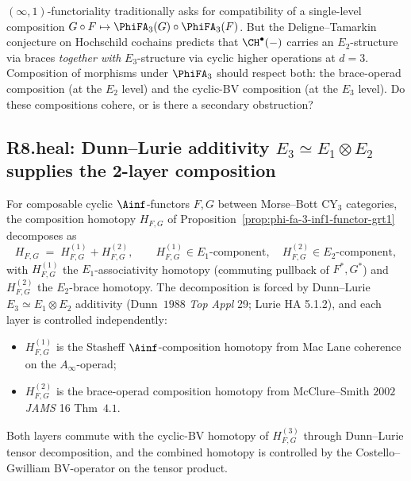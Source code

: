$(\infty,1)$-functoriality traditionally asks for compatibility of a
single-level composition $G \circ F \mapsto \PhiFA_3(G) \circ
\PhiFA_3(F)$.  But the Deligne--Tamarkin conjecture on Hochschild
cochains predicts that $\CH^\bullet(-)$ carries an $E_2$-structure via
braces \emph{together with} $E_3$-structure via cyclic higher
operations at $d = 3$.  Composition of morphisms under $\PhiFA_3$
should respect both: the brace-operad composition (at the $E_2$ level)
and the cyclic-BV composition (at the $E_3$ level).  Do these
compositions cohere, or is there a secondary obstruction?

\subsection*{R8.heal: Dunn--Lurie additivity $E_3 \simeq E_1 \otimes E_2$
supplies the 2-layer composition}

\begin{proposition}
\label{prop:two-layer-composition-dunn-lurie}
\ClaimStatusProvedHere
For composable cyclic $\Ainf$-functors $F, G$ between Morse--Bott
CY$_3$ categories, the composition homotopy $H_{F, G}$ of
Proposition~\ref{prop:phi-fa-3-inf1-functor-grt1} decomposes as
\[
  H_{F, G}
  \;=\;
  H^{(1)}_{F, G} + H^{(2)}_{F, G},
  \qquad
  H^{(1)}_{F,G} \in E_1\text{-component},
  \quad
  H^{(2)}_{F,G} \in E_2\text{-component},
\]
with $H^{(1)}_{F,G}$ the $E_1$-associativity homotopy (commuting
pullback of $F^*, G^*$) and $H^{(2)}_{F,G}$ the $E_2$-brace homotopy.
The decomposition is forced by Dunn--Lurie $E_3 \simeq E_1 \otimes E_2$
additivity (Dunn~$1988$ \emph{Top Appl} 29; Lurie HA 5.1.2), and each
layer is controlled independently:
\begin{itemize}
 \item $H^{(1)}_{F,G}$ is the Stasheff $\Ainf$-composition homotopy
       from Mac Lane coherence on the $A_\infty$-operad;
 \item $H^{(2)}_{F,G}$ is the brace-operad composition homotopy from
       McClure--Smith $2002$ \emph{JAMS} 16 Thm~$4.1$.
\end{itemize}
Both layers commute with the cyclic-BV homotopy of $H^{(3)}_{F,G}$
through Dunn--Lurie tensor decomposition, and the combined homotopy is
controlled by the Costello--Gwilliam BV-operator on the tensor product.
\end{proposition}

